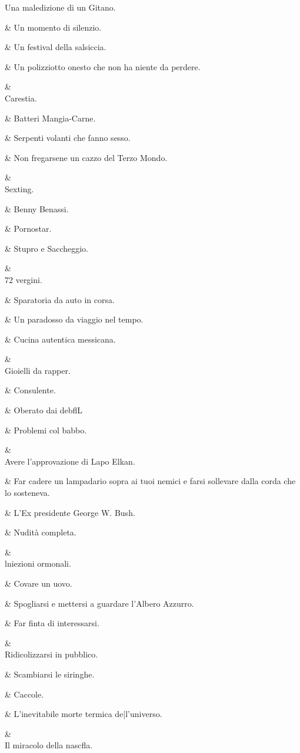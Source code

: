Una maledizione
di un Gitano.

&
Un momento di
silenzio.

&
Un festival della
salsiccia.

&
Un polizziotto
onesto che non
ha niente da
perdere.

&
\\
Carestia.

&
Batteri
Mangia-Carne.

&
Serpenti volanti
che fanno sesso.

&
Non fregarsene
un cazzo del
Terzo Mondo.

&
\\
Sexting.

&
Benny Benassi.

&
Pornostar.

&
Stupro e
Saccheggio.

&
\\
72 vergini.

&
Sparatoria da
auto in corsa.

&
Un paradosso
da viaggio nel
tempo.

&
Cucina autentica
messicana.

&
\\
Gioielli da rapper.

&
Consulente.

&
Oberato dai
debﬂL

&
Problemi col
babbo.

&
\\
Avere
l'approvazione di
Lapo Elkan.

&
Far cadere un
lampadario sopra
ai tuoi nemici e
farsi sollevare
dalla corda che lo
sosteneva.

&
L’Ex presidente
George W. Bush.

&
Nudità completa.

&
\\
lniezioni
ormonali.

&
Covare un uovo.

&
Spogliarsi e
mettersi a
guardare l’Albero
Azzurro.

&
Far finta di
interessarsi.

&
\\
Ridicolizzarsi in
pubblico.

&
Scambiarsi le
siringhe.

&
Caccole.

&
L’inevitabile
morte termica
de|l’universo.

&
\\
Il miracolo della
nascﬂa.

